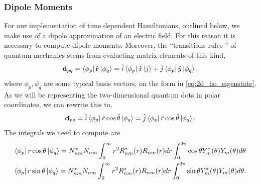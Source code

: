 \subsubsection{Dipole Moments}
For our implementation of time dependent Hamiltonians, outlined below, we make use of 
a dipole approximation of an electric field. For this reason it is necessary to compute 
dipole moments. Moreover, the ``transitions rules
'' of quantum mechanics stems from evalueting matrix elements of this kind,
\begin{equation}
    \vb{d}_{pq} = \bra{\phi_p} \hat{\vb{r}} \ket{\phi_q} 
        = \hat{i}\bra{\phi_p} \hat{x} \ket{j} + \hat{j}  \bra{\phi_p} \hat{y} \ket{\phi_q},
\end{equation}
where $\phi_p, \phi_q$ are some typical basis vectors, on the form in \autoref{eq:2d_ho_eigenstate}.
As we will be representing the two-dimensional quantum dots in polar coordinates,
we can rewrite this to,
\begin{equation}
    \vb{d}_{pq} 
        = \hat{i}\bra{\phi_p} \hat{r}\cos{\hat{\theta}}\ket{\phi_q}
        = \hat{j}\bra{\phi_p} \hat{r}\cos{\hat{\theta}}\ket{\phi_q}.
\end{equation}
The integrals we need to compute are
\begin{gather}
    \bra{\phi_p} r \cos\theta \ket{\phi_q} 
        = 
        N_{nm}^* N_{nm} 
        \int_0^\infty r^2 R^*_{nm}(r)R_{nm}(r) dr
        \int_0^{2\pi} \cos\theta Y^*_{m}(\theta)Y_{m}(\theta)d\theta \\
    \bra{\phi_p} r \sin\theta \ket{\phi_q} 
        = 
        N_{nm}^* N_{nm} 
        \int_0^\infty r^2 R^*_{nm}(r)R_{nm}(r) dr
        \int_0^{2\pi} \sin\theta Y^*_{m}(\theta)Y_{m}(\theta)d\theta.
\end{gather}



